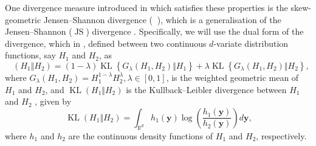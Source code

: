 \documentclass[
  12pt]{article}
\DeclareMathOperator{\KL}{\mathrm{KL}}
\DeclareMathOperator{\JS}{\mathrm{JS}}
\newcommand{\JSGa}{\mathop{\mathrm{JS}^{\mathrm{G}_{\lambda}}}\nolimits}
\begin{document}
One divergence measure introduced in \citet{Nielsen2019} which satisfies these properties is the skew-geometric Jensen--Shannon divergence ($\JSGa{}$), which is a generalisation of the Jensen--Shannon ($\JS{}$) divergence \citep{Lin1991}. 
Specifically, we will use the dual form of the $\JSGa{}$ divergence, which in \citet{Deasy2020}, defined between two continuous $d$-variate distribution functions, say $H_1$ and $H_2$, as 
\begin{equation}~\label{eq:jsga}
  \JSGa{(H_1 \Vert H_2)} = (1- \lambda) \KL{\left\{G_{\lambda}(H_1, H_2) \Vert H_1\right\}} + \lambda \KL{\left\{G_{\lambda}(H_1, H_2) \Vert H_2\right\}},
\end{equation}
where $G_{\lambda}(H_1, H_2) = H_{1}^{1-\lambda} H_{2}^{\lambda}, \lambda \in [0, 1]$, is the weighted geometric mean of $H_1$ and $H_2$, and $\KL{(H_1 \Vert H_2)}$ is the Kullback--Leibler divergence between $H_1$ and $H_2$ \citep{Kullback1951}, given by 
\begin{equation}~\label{eq:kl}
  \KL{(H_1 \Vert H_2)} = \int_{\mathbb{R}^d} h_1(\symbf{y}) \log\left(\frac{h_1(\symbf{y})}{h_2(\symbf{y})}\right) d\symbf{y},
\end{equation}
where $h_1$ and $h_2$ are the continuous density functions of $H_1$ and $H_2$, respectively. 
\end{document}
